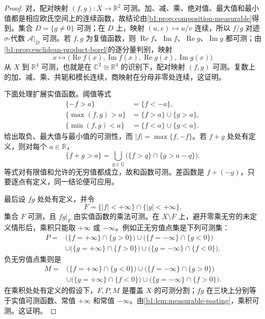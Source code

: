 \begin{proof}
对，配对映射 \((f,g):X\rightarrow\mathbb R^2\) 可测。加、减、乘、绝对值、最大值和最小值都是相应欧氏空间上的连续函数，故结论由\cref{b1:prop:composition-measurable}得到。集合
\(D=\{g\ne0\}\) 可测；在 \(D\) 上，映射
\((u,v)\mapsto u/v\) 连续，所以 \(f/g\) 对迹 \(\sigma\)-代数 \(\mathcal A|_D\) 可测。若 \(f,g\) 为复值函数，则
\(\operatorname{Re}f\)、\(\operatorname{Im}f\)、\(\operatorname{Re}g\)、\(\operatorname{Im}g\) 都可测；由\cref{b1:prop:euclidean-product-borel}的逐分量判别，映射
\[
x\longmapsto
\bigl(\operatorname{Re}f(x),\operatorname{Im}f(x),
 \operatorname{Re}g(x),\operatorname{Im}g(x)\bigr)
\]
从 \(X\) 到 \(\mathbb R^4\) 可测，也就是在 \(\mathbb C^2\cong\mathbb R^4\) 的识别下，配对映射 \((f,g)\) 可测。复数上的加、减、乘、共轭和模长连续，商映射在分母非零处连续，这证明。

下面处理扩展实值函数。阈值等式
\[
\begin{aligned}
\{-f>a\}&=\{f<-a\},\\
\{\max(f,g)>a\}&=\{f>a\}\cup\{g>a\},\\
\{\min(f,g)<a\}&=\{f<a\}\cup\{g<a\}.
\end{aligned}
\]
给出取负、最大值与最小值的可测性，而
\(|f|=\max\{f,-f\}\)。若 \(f+g\) 处处有定义，则对每个 \(a\in\mathbb R\)，
\[
\{f+g>a\}
=\bigcup_{q\in\mathbb Q}
\bigl(\{f>q\}\cap\{g>a-q\}\bigr).
\]
等式对有限值和允许的无穷值都成立，故和函数可测。差函数是 \(f+(-g)\)，只要逐点有定义，同一结论便可应用。

最后设 \(fg\) 处处有定义，并令
\[
F=\{|f|<+\infty\}\cap\{|g|<+\infty\}.
\]
集合 \(F\) 可测，且 \(fg|_F\) 由实值函数的乘法可测。在 \(X\setminus F\) 上，避开零乘无穷的未定义情形后，乘积只能取 \(+\infty\) 或 \(-\infty\)。例如正无穷值点集是下列可测集：
\begin{align*}
P={}&\bigl(\{f=+\infty\}\cap\{g>0\}\bigr)
\cup\bigl(\{f=-\infty\}\cap\{g<0\}\bigr)\\
&\cup\bigl(\{g=+\infty\}\cap\{f>0\}\bigr)
\cup\bigl(\{g=-\infty\}\cap\{f<0\}\bigr).
\end{align*}
负无穷值点集则是
\begin{align*}
M={}&\bigl(\{f=+\infty\}\cap\{g<0\}\bigr)
\cup\bigl(\{f=-\infty\}\cap\{g>0\}\bigr)\\
&\cup\bigl(\{g=+\infty\}\cap\{f<0\}\bigr)
\cup\bigl(\{g=-\infty\}\cap\{f>0\}\bigr).
\end{align*}
在乘积处处有定义的假设下，\(F,P,M\) 是覆盖 \(X\) 的可测分割；\(fg\) 在三块上分别等于实值可测函数、常值 \(+\infty\) 和常值 \(-\infty\)。由\cref{b1:lem:measurable-pasting}，乘积可测。这证明。
\end{proof}

